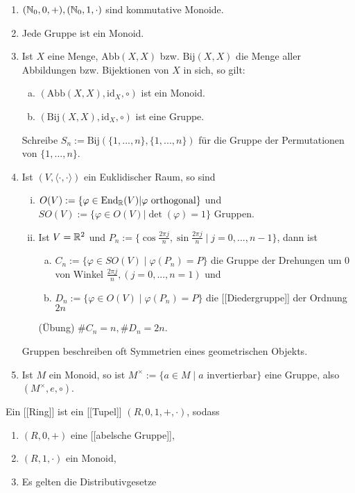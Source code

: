 \documentclass[a4paper]{report}
\begin{document}
\begin{bsp*}
  \begin{enumerate}[1)]
\item $(\Bbb N_{0}, 0, +), (\Bbb N_{0}, 1, \cdot)$ sind kommutative Monoide.
\item Jede Gruppe ist ein Monoid.
\item Ist $X$ eine Menge, $\mathrm{Abb}(X,X)$ bzw. $\mathrm{Bij}(X,X)$ die Menge aller Abbildungen bzw. Bijektionen von $X$ in sich, so gilt:
\begin{enumerate}[(a)]
    \item $(\mathrm{Abb}(X,X), \mathrm{id}_{X}, \circ)$ ist ein Monoid.
    \item $(\mathrm{Bij}(X,X), \mathrm{id}_{X}, \circ)$ ist eine Gruppe.
\end{enumerate}
    Schreibe $S_{n}:=\mathrm{Bij}(\{1, ..., n\}, \{1, ..., n\})$ für die Gruppe der Permutationen von $\{1, ..., n\}$.
    \item Ist $(V, \langle \cdot, \cdot \rangle)$ ein Euklidischer Raum, so sind
    \begin{enumerate}[(i)]
    \item $O(V):= \{\varphi \in \mathrm{End}_{\Bbb R}(V) | \varphi \text{ orthogonal}\}$ und $SO(V):= \{\varphi \in O(V) | \det(\varphi) = 1\}$ Gruppen.
    \item Ist $V = \Bbb R^{2}$ und $P_{n}:=\{\cos \frac{2\pi j}{n}, \sin \frac{2\pi j}{n} \mid j = 0, ..., n-1\}$, dann ist
    \begin{enumerate}[(a)]
        \item $C_{n}:= \{\varphi \in SO(V) \mid \varphi(P_{n}) = P\}$ die Gruppe der Drehungen um 0 von Winkel $\frac{2\pi j}{n}, (j=0, ..., n=1)$ und
        \item $D_{n}:= \{\varphi \in O(V) \mid \varphi(P_{n})=P\}$ die [[Diedergruppe]] der Ordnung $2n$

    \end{enumerate}
        (Übung) $\#C_{n} = n, \#D_{n} = 2n$.
    \end{enumerate}
    Gruppen beschreiben oft Symmetrien eines geometrischen Objekts.
\item Ist $M$ ein Monoid, so ist $M^\times:=\{a \in M \mid a \text{ invertierbar}\}$ eine Gruppe, also $(M^{\times}, e, \circ)$.

  \end{enumerate}


\end{bsp*}
\begin{defi}
  Ein [[Ring]] ist ein [[Tupel]] $(R, 0, 1, +, \cdot)$, sodass
  \begin{enumerate}[(R1)]
    \item $(R, 0, +)$ eine [[abelsche Gruppe]],
    \item $(R, 1, \cdot)$ ein Monoid,
    \item Es gelten die Distributivgesetze
  \end{enumerate}
\end{defi}
\end{document}
